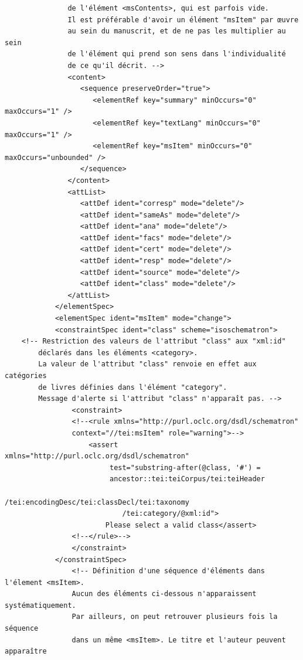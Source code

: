 \documentclass[a4paper,12pt,twoside]{book}
\begin{document}
\begin{verbatim}
               de l'élément <msContents>, qui est parfois vide. 
               Il est préférable d'avoir un élément "msItem" par œuvre 
               au sein du manuscrit, et de ne pas les multiplier au sein 
               de l'élément qui prend son sens dans l'individualité 
               de ce qu'il décrit. -->
               <content>
                  <sequence preserveOrder="true">
                     <elementRef key="summary" minOccurs="0" maxOccurs="1" />
                     <elementRef key="textLang" minOccurs="0" maxOccurs="1" />
                     <elementRef key="msItem" minOccurs="0" maxOccurs="unbounded" />            
                  </sequence>
               </content>
               <attList>
                  <attDef ident="corresp" mode="delete"/>
                  <attDef ident="sameAs" mode="delete"/>
                  <attDef ident="ana" mode="delete"/>
                  <attDef ident="facs" mode="delete"/>
                  <attDef ident="cert" mode="delete"/>
                  <attDef ident="resp" mode="delete"/>
                  <attDef ident="source" mode="delete"/>
                  <attDef ident="class" mode="delete"/>
               </attList>
            </elementSpec>
            <elementSpec ident="msItem" mode="change">
            <constraintSpec ident="class" scheme="isoschematron">
    <!-- Restriction des valeurs de l'attribut "class" aux "xml:id" 
        déclarés dans les éléments <category>. 
        La valeur de l'attribut "class" renvoie en effet aux catégories 
        de livres définies dans l'élément "category".
        Message d'alerte si l'attribut "class" n'apparaît pas. -->
                <constraint>
                <!--<rule xmlns="http://purl.oclc.org/dsdl/schematron" 
                context="//tei:msItem" role="warning">-->
                    <assert xmlns="http://purl.oclc.org/dsdl/schematron" 
                         test="substring-after(@class, '#') = 
                         ancestor::tei:teiCorpus/tei:teiHeader
                            /tei:encodingDesc/tei:classDecl/tei:taxonomy
                            /tei:category/@xml:id">
                        Please select a valid class</assert> 
                <!--</rule>-->
                </constraint>
            </constraintSpec>
                <!-- Définition d'une séquence d'éléments dans l'élement <msItem>. 
                Aucun des éléments ci-dessous n'apparaissent systématiquement. 
                Par ailleurs, on peut retrouver plusieurs fois la séquence 
                dans un même <msItem>. Le titre et l'auteur peuvent apparaître

\end{verbatim}
\end{document}
